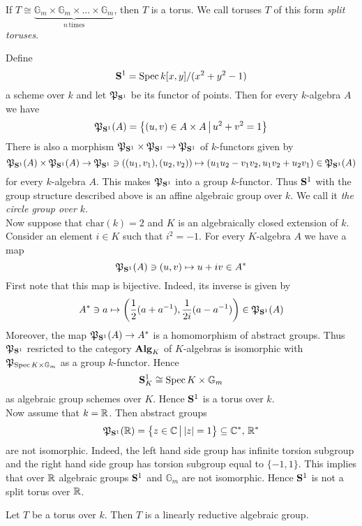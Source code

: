 \begin{example}\label{example:split_torus}
If $T \cong \underbrace{\mathbb{G}_{m}\times \mathbb{G}_{m}\times ...\times \mathbb{G}_{m}}_{n\,\mathrm{times}}$, then $T$ is a torus. We call toruses $T$ of this form \textit{split toruses}.
\end{example}

\begin{example}\label{example:non_split_torus}
Define
$$\mathbf{S}^1 = \mathrm{Spec}\, k[x,y]/(x^2+y^2-1)$$
a scheme over $k$ and let ${\mathfrak P}_{\mathbf{S}^1}$ be its functor of points. Then for every $k$-algebra $A$ we have
$${\mathfrak P}_{\mathbf{S}^1}(A) = \big\{(u,v)\in A\times A\,\big|\,u^2+v^2=1\big\}$$
There is also a morphism ${\mathfrak P}_{\mathbf{S}^1}\times {\mathfrak P}_{\mathbf{S}^1}\rightarrow {\mathfrak P}_{\mathbf{S}^1}$ of $k$-functors given by
$${\mathfrak P}_{\mathbf{S}^1}(A)\times {\mathfrak P}_{\mathbf{S}^1}(A)\rightarrow {\mathfrak P}_{\mathbf{S}^1}\ni \left((u_1,v_1),(u_2,v_2)\right)\mapsto (u_1u_2-v_1v_2,u_1v_2+u_2v_1)\in {\mathfrak P}_{\mathbf{S}^1}(A)$$
for every $k$-algebra $A$. This makes ${\mathfrak P}_{\mathbf{S}^1}$ into a group $k$-functor. Thus $\mathbf{S}^1$ with the group structure described above is an affine algebraic group over $k$. We call it \textit{the circle group over $k$}.\\
Now suppose that $\mathrm{char}(k)=2$ and $K$ is an algebraically closed extension of $k$. Consider an element $i\in K$ such that $i^2 = -1$. For every $K$-algebra $A$ we have a map
$${\mathfrak P}_{\mathbf{S}^1}(A)\ni (u,v)\mapsto u+iv\in A^*$$
First note that this map is bijective. Indeed, its inverse is given by
$$A^*\ni a \mapsto \left(\frac{1}{2}(a+a^{-1}),\frac{1}{2i}(a-a^{-1})\right) \in {\mathfrak P}_{\mathbf{S}^1}(A)$$
Moreover, the map ${\mathfrak P}_{\mathbf{S}^1}(A)\rightarrow A^*$ is a homomorphism of abstract groups. Thus ${\mathfrak P}_{\mathbf{S}^1}$ resricted to the category $\mathbf{Alg}_K$ of $K$-algebras is isomorphic with ${\mathfrak P}_{\mathrm{Spec}\, K\times \mathbb{G}_{m}}$ as a group $k$-functor. Hence
$$\mathbf{S}^1_K \cong \mathrm{Spec}\, K\times \mathbb{G}_{m}$$
as algebraic group schemes over $K$. Hence $\mathbf{S}^1$ is a torus over $k$.\\
Now assume that $k = {\mathbb R}$. Then abstract groups
$${\mathfrak P}_{\mathbf{S}^1}({\mathbb R}) = \big\{z\in {\mathbb C}\,\big|\,|z|=1\big\} \subseteq {\mathbb C}^*,\,{\mathbb R}^*$$
are not isomorphic. Indeed, the left hand side group has infinite torsion subgroup and the right hand side group has torsion subgroup equal to $\{-1,1\}$. This implies that over ${\mathbb R}$ algebraic groups $\mathbf{S}^1$ and $\mathbb{G}_{m}$ are not isomorphic. Hence $\mathbf{S}^1$ is not a split torus over ${\mathbb R}$.
\end{example}

\begin{corollary}\label{corollary:toruses_are_linearly_reductive}
Let $T$ be a torus over $k$. Then $T$ is a linearly reductive algebraic group.
\end{corollary}

